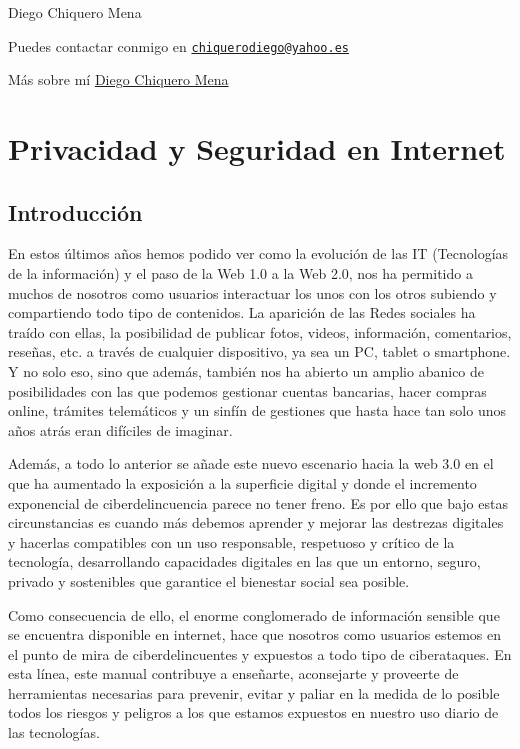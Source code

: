 \documentclass[
  spanish,
  a4paper,
  openany]{book}
\begin{document}
Diego Chiquero Mena

Puedes contactar conmigo en \href{mailto:chiquerodiego@yahoo.es}{\nolinkurl{chiquerodiego@yahoo.es}}

Más sobre mí \href{https://about.me/diegochiquero}{Diego Chiquero Mena}

\hypertarget{privacidad-y-seguridad-en-internet}{%
\chapter{Privacidad y Seguridad en Internet}\label{privacidad-y-seguridad-en-internet}}

\hypertarget{introducciuxf3n}{%
\section{Introducción}\label{introducciuxf3n}}

En estos últimos años hemos podido ver como la evolución de las IT (Tecnologías de la información) y el paso de la Web 1.0 a la Web 2.0, nos ha permitido a muchos de nosotros como usuarios interactuar los unos con los otros subiendo y compartiendo todo tipo de contenidos. La aparición de las Redes sociales ha traído con ellas, la posibilidad de publicar fotos, videos, información, comentarios, reseñas, etc. a través de cualquier dispositivo, ya sea un PC, tablet o smartphone. Y no solo eso, sino que además, también nos ha abierto un amplio abanico de posibilidades con las que podemos gestionar cuentas bancarias, hacer compras online, trámites telemáticos y un sinfín de gestiones que hasta hace tan solo unos años atrás eran difíciles de imaginar.

Además, a todo lo anterior se añade este nuevo escenario hacia la web 3.0 en el que ha aumentado la exposición a la superficie digital y donde el incremento exponencial de ciberdelincuencia parece no tener freno. Es por ello que bajo estas circunstancias es cuando más debemos aprender y mejorar las destrezas digitales y hacerlas compatibles con un uso responsable, respetuoso y crítico de la tecnología, desarrollando capacidades digitales en las que un entorno, seguro, privado y sostenibles que garantice el bienestar social sea posible.

Como consecuencia de ello, el enorme conglomerado de información sensible que se encuentra disponible en internet, hace que nosotros como usuarios estemos en el punto de mira de ciberdelincuentes y expuestos a todo tipo de ciberataques. En esta línea, este manual contribuye a enseñarte, aconsejarte y proveerte de herramientas necesarias para prevenir, evitar y paliar en la medida de lo posible todos los riesgos y peligros a los que estamos expuestos en nuestro uso diario de las tecnologías.
\end{document}
